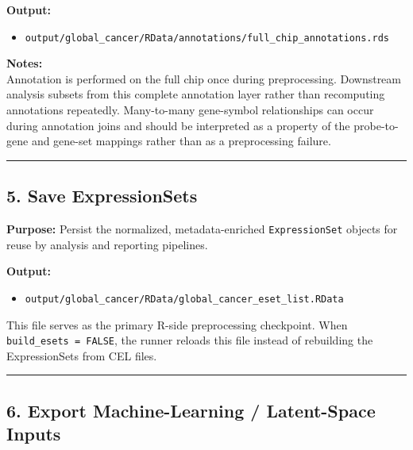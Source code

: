 \documentclass[
  letterpaper,
  DIV=11,
  numbers=noendperiod,
  openany,
  oneside]{scrreprt}
\providecommand{\tightlist}{%
  \setlength{\itemsep}{0pt}\setlength{\parskip}{0pt}}
\begin{document}
\textbf{Output:}

\begin{itemize}
\tightlist
\item
  \texttt{output/global\_cancer/RData/annotations/full\_chip\_annotations.rds}
\end{itemize}

\textbf{Notes:}\\
Annotation is performed on the full chip once during preprocessing.
Downstream analysis subsets from this complete annotation layer rather
than recomputing annotations repeatedly. Many-to-many gene-symbol
relationships can occur during annotation joins and should be
interpreted as a property of the probe-to-gene and gene-set mappings
rather than as a preprocessing failure.

\begin{center}\rule{0.5\linewidth}{0.5pt}\end{center}

\subsection*{5. Save ExpressionSets}\label{save-expressionsets}

\textbf{Purpose:} Persist the normalized, metadata-enriched
\texttt{ExpressionSet} objects for reuse by analysis and reporting
pipelines.

\textbf{Output:}

\begin{itemize}
\tightlist
\item
  \texttt{output/global\_cancer/RData/global\_cancer\_eset\_list.RData}
\end{itemize}

This file serves as the primary R-side preprocessing checkpoint. When
\texttt{build\_esets\ =\ FALSE}, the runner reloads this file instead of
rebuilding the ExpressionSets from CEL files.

\begin{center}\rule{0.5\linewidth}{0.5pt}\end{center}

\subsection*{6. Export Machine-Learning / Latent-Space
Inputs}\label{export-machine-learning-latent-space-inputs}
\end{document}
